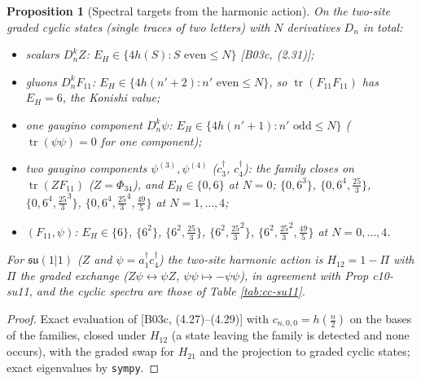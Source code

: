 \documentclass[11pt]{article}
\numberwithin{equation}{section}
\theoremstyle{plain}
\newtheorem{proposition}[theorem]{Proposition}
\theoremstyle{definition}
\begin{document}
\begin{proposition}[Spectral targets from the harmonic action]
\label{prop:cc-targets}
On the two-site graded cyclic states (single traces of two letters) with $N$ derivatives $D_n$ in total:
\begin{itemize}
\item[(i)] scalars $D_n^kZ$: $E_H\in\{4h(S):S\text{ even}\le N\}$ [B03c, (2.31)];
\item[(ii)] gluons $D_n^kF_{11}$: $E_H\in\{4h(n'+2):n'\text{ even}\le N\}$, so $\operatorname{tr}(F_{11}F_{11})$ has $E_H=6$, the Konishi value;
\item[(iii)] one gaugino component $D_n^k\psi$: $E_H\in\{4h(n'+1):n'\text{ odd}\le N\}$ ($\operatorname{tr}(\psi\psi)=0$ for one component);
\item[(iv)] two gaugino components $\psi^{(3)},\psi^{(4)}$ ($c_3^\dagger$, $c_4^\dagger$): the family closes on $\operatorname{tr}(Z F_{11})$ ($Z=\Phi_{34}$), and $E_H\in\{0,6\}$ at $N=0$; $\{0,6^3\}$, $\{0,6^4,\tfrac{25}3\}$, $\{0,6^4,\tfrac{25}3^3\}$, $\{0,6^4,\tfrac{25}3^4,\tfrac{49}5\}$ at $N=1,\dots,4$;
\item[(v)] $(F_{11},\psi)$: $E_H\in\{6\}$, $\{6^2\}$, $\{6^2,\tfrac{25}3\}$, $\{6^2,\tfrac{25}3^2\}$, $\{6^2,\tfrac{25}3^2,\tfrac{49}5\}$ at $N=0,\dots,4$.
\end{itemize}
For $\mathfrak{su}(1|1)$ ($Z$ and $\psi=a_1^\dagger c_4^\dagger$) the two-site harmonic action is $H_{12}=1-\Pi$ with $\Pi$ the graded exchange ($Z\psi\leftrightarrow\psi Z$, $\psi\psi\mapsto-\psi\psi$), in agreement with Prop c10-su11, and the cyclic spectra are those of Table \ref{tab:cc-su11}.
\end{proposition}

\begin{proof}
Exact evaluation of [B03c, (4.27)--(4.29)] with $c_{n,0,0}=h(\tfrac n2)$ on the bases of the families, closed under $H_{12}$ (a state leaving the family is detected and none occurs), with the graded swap for $H_{21}$ and the projection to graded cyclic states; exact eigenvalues by \texttt{sympy}.
\end{proof}
\end{document}
